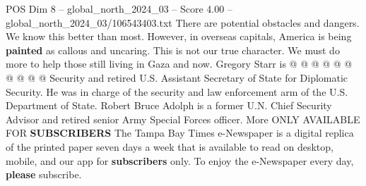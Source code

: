\begin{textsample}{POS Dim 8 – global\_north\_2024\_03 – Score 4.00 – global\_north\_2024\_03/106543403.txt}
There are potential obstacles and dangers.
We know this better than most.
However, in overseas capitals, America is being \textbf{painted} as callous and uncaring.
This is not our true character.
We must do more to help those still living in Gaza and now.
Gregory Starr is @ @ @ @ @ @ @ @ @ @ Security and retired U.S.
Assistant Secretary of State for Diplomatic Security.
He was in charge of the security and law enforcement arm of the U.S.
Department of State.
Robert Bruce Adolph is a former U.N.
Chief Security Advisor and retired senior Army Special Forces officer.
More ONLY AVAILABLE FOR \textbf{SUBSCRIBERS} The Tampa Bay Times e-Newspaper is a digital replica of the printed paper seven days a week that is available to read on desktop, mobile, and our app for \textbf{subscribers} only.
To enjoy the e-Newspaper every day, \textbf{please} subscribe.

\end{textsample}
